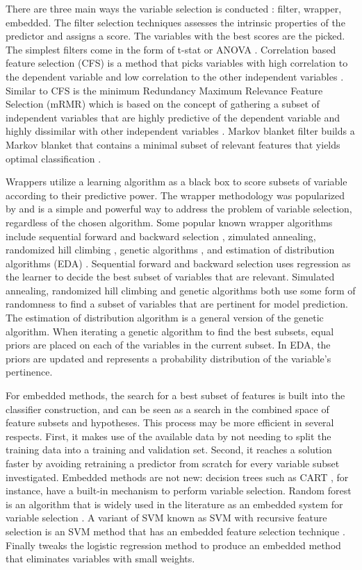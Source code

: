 There are three main ways the variable selection is conducted \citep{Saeys07} : filter, wrapper, embedded. The filter selection techniques assesses the intrinsic properties of the predictor and assigns a score. The variables with the best scores are the picked. The simplest filters come in the form of t-stat or ANOVA  \citep{Jafari06}. Correlation based feature selection (CFS) is a method that picks variables with high correlation to the dependent variable and low correlation to the other independent variables \citep{Hall99}. Similar to CFS is the minimum Redundancy Maximum Relevance Feature Selection (mRMR) which is based on the concept of gathering a subset of independent variables that are highly predictive of the dependent variable and highly dissimilar with other independent variables \citep{Ding03}. Markov blanket filter builds a Markov blanket that contains a minimal subset of relevant features that yields optimal classification \citep{Zeng09}. 

Wrappers utilize a learning algorithm as a black box to score subsets of variable according to their predictive power. The wrapper methodology was popularized by \citet{Kohavi96} and is a simple and powerful way to address the problem of variable selection, regardless of the chosen algorithm. Some popular known wrapper algorithms include sequential forward and backward selection \citep{Kittler78}, zimulated annealing\citep{Kirkpatrick83}, randomized hill climbing \citep{Skalak94}, genetic algorithms \citep{Holland75}, and estimation of distribution algorithms (EDA) \citep{Blanco04}. Sequential forward and backward selection uses regression as the learner to decide the best subset of variables that are relevant. Simulated annealing, randomized hill climbing and genetic algorithms both use some form of randomness to find a subset of variables that are pertinent for model prediction. The estimation of distribution algorithm is a general version of the genetic algorithm. When iterating a genetic algorithm to find the best subsets, equal priors are placed on each of the variables in the current subset. In EDA, the priors are updated and represents a probability distribution of the variable's pertinence. 

For embedded methods, the search for a best subset of features is built into the classifier construction, and can be seen as a search in the combined space of feature subsets and hypotheses. This process may be more efficient in several respects. First, it makes use of the available data by not needing to split the training data into a training and validation set. Second, it reaches a solution faster by avoiding retraining a predictor from scratch for every variable subset investigated. Embedded methods are not new: decision trees such as CART \citep{Breiman84}, for instance, have a built-in mechanism to perform variable selection. Random forest is an algorithm that is widely used in the literature as an embedded system for variable selection \citep{Diaz06}\citep{Jiang04}. A variant of SVM known as SVM with recursive feature selection is an SVM method that has an embedded feature selection technique \citep{Guyon02}. Finally \citet{Ma05} tweaks the logistic regression method to produce an embedded method that eliminates variables with small weights.

